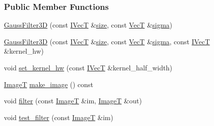\subsubsection*{Public Member Functions}
\begin{DoxyCompactItemize}
\item 
\hyperlink{classboxxer_1_1GaussFilter3D_acb9157d2158ac82264d2a3c849bd3ec3}{Gauss\+Filter3D} (const \hyperlink{classboxxer_1_1GaussFIRFilter_a0083c8c9ab6032dd458b4dc93852c2b8}{I\+VecT} \&\hyperlink{classboxxer_1_1GaussFIRFilter_ac0d4e19bb2be3e8913e77283e7e4317e}{size}, const \hyperlink{classboxxer_1_1GaussFilter3D_a0b98b323516d0fcb1422b10d63a70156}{VecT} \&\hyperlink{classboxxer_1_1GaussFIRFilter_a66ced06c688fd544d5f1f8be39aa2125}{sigma})
\item 
\hyperlink{classboxxer_1_1GaussFilter3D_a82355b9738082bade628c70c3077ff26}{Gauss\+Filter3D} (const \hyperlink{classboxxer_1_1GaussFIRFilter_a0083c8c9ab6032dd458b4dc93852c2b8}{I\+VecT} \&\hyperlink{classboxxer_1_1GaussFIRFilter_ac0d4e19bb2be3e8913e77283e7e4317e}{size}, const \hyperlink{classboxxer_1_1GaussFilter3D_a0b98b323516d0fcb1422b10d63a70156}{VecT} \&\hyperlink{classboxxer_1_1GaussFIRFilter_a66ced06c688fd544d5f1f8be39aa2125}{sigma}, const \hyperlink{classboxxer_1_1GaussFIRFilter_a0083c8c9ab6032dd458b4dc93852c2b8}{I\+VecT} \&kernel\+\_\+hw)
\item 
void \hyperlink{classboxxer_1_1GaussFilter3D_ac6d9013c566f27443b9e897ae58bcdd8}{set\+\_\+kernel\+\_\+hw} (const \hyperlink{classboxxer_1_1GaussFIRFilter_a0083c8c9ab6032dd458b4dc93852c2b8}{I\+VecT} \&kernel\+\_\+half\+\_\+width)
\item 
\hyperlink{classboxxer_1_1GaussFilter3D_a62eb2a74863e76bd9237928521185d7a}{ImageT} \hyperlink{classboxxer_1_1GaussFilter3D_af4298d5e1cf4f6f298d0f044d044e7c3}{make\+\_\+image} () const 
\item 
void \hyperlink{classboxxer_1_1GaussFilter3D_a3e909393e79507c03c6cfc25aeed5b8a}{filter} (const \hyperlink{classboxxer_1_1GaussFilter3D_a62eb2a74863e76bd9237928521185d7a}{ImageT} \&im, \hyperlink{classboxxer_1_1GaussFilter3D_a62eb2a74863e76bd9237928521185d7a}{ImageT} \&out)
\item 
void \hyperlink{classboxxer_1_1GaussFilter3D_a9b0e3c1d99cfa3a67c25f16c1a06182e}{test\+\_\+filter} (const \hyperlink{classboxxer_1_1GaussFilter3D_a62eb2a74863e76bd9237928521185d7a}{ImageT} \&im)
\end{DoxyCompactItemize}
